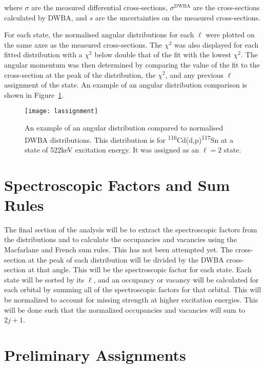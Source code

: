 where $\sigma$ are the measured differential cross-sections, $\sigma^{\mathrm{DWBA}}$ are the cross-sections calculated by DWBA, and $s$ are the uncertainties on the measured cross-sections.

For each state, the normalised angular distributions for each $\ell$ were plotted on the same axes as the measured cross-sections. The $\chi^2$ was also displayed for each fitted distribution with a $\chi^2$ below double that of the fit with the lowest $\chi^2$. The angular momentum was then determined by comparing the value of the fit to the cross-section at the peak of the distribution, the $\chi^2$, and any previous $\ell$ assignment of the state. An example of an angular distribution comparison is shown in Figure~\ref{lAssignment}.

\begin{figure}[h]	
\hspace*{-0.5cm}
\begin{center}	
	\texttt{[image: lassignment]}
\end{center}
			\caption[Example of DWBA angular distributions normalised to a measured distribution ]{An example of an angular distribution compared to normalised DWBA distributions. This distribution is for \textsuperscript{116}Cd(d,p)\textsuperscript{117}Sn at a state of 522keV excitation energy. It was assigned as an $\ell = 2$ state.}
		\label{lAssignment}
\end{figure}
\FloatBarrier

\section{Spectroscopic Factors and Sum Rules}

The final section of the analysis will be to extract the spectroscopic factors from the distributions and to calculate the occupancies and vacancies using the Macfarlane and French sum rules. This has not been attempted yet. The cross-section at the peak of each distribution will be divided by the DWBA cross-section at that angle. This will be the spectroscopic factor for each state. Each state will be sorted by its $\ell$, and an occupancy or vacancy will be calculated for each orbital by summing all of the spectroscopic factors for that orbital. This will be normalized to account for missing strength at higher excitation energies. This will be done such that the normalized occupancies and vacancies will sum to $2j + 1$.

\section{Preliminary Assignments}

